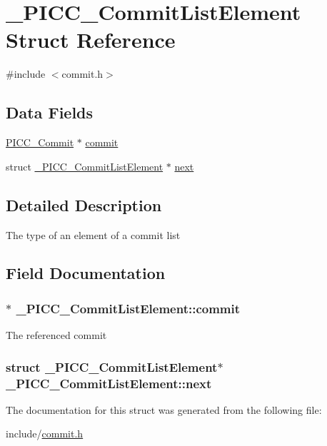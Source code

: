 \hypertarget{struct__PICC__CommitListElement}{\section{\-\_\-\-P\-I\-C\-C\-\_\-\-Commit\-List\-Element Struct Reference}
\label{struct__PICC__CommitListElement}
}


{\ttfamily \#include $<$commit.\-h$>$}

\subsection*{Data Fields}
{\bf }\par
\begin{DoxyCompactItemize}
\item 
\hyperlink{commit_8h_a655097bbaf0e81713b6d9336948c211c}{P\-I\-C\-C\-\_\-\-Commit} $\ast$ \hyperlink{struct__PICC__CommitListElement_aa8876c6c20d9b84d3e4c1767a11d8bcc}{commit}
\item 
struct \hyperlink{struct__PICC__CommitListElement}{\-\_\-\-P\-I\-C\-C\-\_\-\-Commit\-List\-Element} $\ast$ \hyperlink{struct__PICC__CommitListElement_a339f4cc910875dbb85401cbea95b7f5a}{next}
\end{DoxyCompactItemize}



\subsection{Detailed Description}
The type of an element of a commit list 

\subsection{Field Documentation}
\hypertarget{struct__PICC__CommitListElement_aa8876c6c20d9b84d3e4c1767a11d8bcc}{
\subsubsection[{commit}]{$\ast$ \-\_\-\-P\-I\-C\-C\-\_\-\-Commit\-List\-Element\-::commit}}\label{struct__PICC__CommitListElement_aa8876c6c20d9b84d3e4c1767a11d8bcc}
The referenced commit \hypertarget{struct__PICC__CommitListElement_a339f4cc910875dbb85401cbea95b7f5a}{
\subsubsection[{next}]{\setlength{\rightskip}{0pt plus 5cm}struct {\bf \-\_\-\-P\-I\-C\-C\-\_\-\-Commit\-List\-Element}$\ast$ \-\_\-\-P\-I\-C\-C\-\_\-\-Commit\-List\-Element\-::next}}\label{struct__PICC__CommitListElement_a339f4cc910875dbb85401cbea95b7f5a}


The documentation for this struct was generated from the following file\-:\begin{DoxyCompactItemize}
\item 
include/\hyperlink{commit_8h}{commit.\-h}\end{DoxyCompactItemize}
